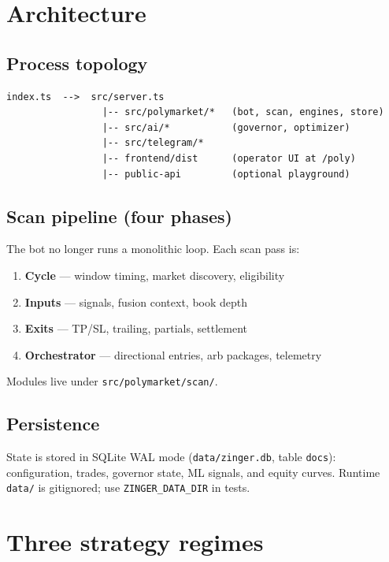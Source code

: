 \documentclass[11pt,a4paper]{report}
\begin{document}
\chapter{Architecture}

\section{Process topology}

\begin{verbatim}
index.ts  -->  src/server.ts
                 |-- src/polymarket/*   (bot, scan, engines, store)
                 |-- src/ai/*           (governor, optimizer)
                 |-- src/telegram/*
                 |-- frontend/dist      (operator UI at /poly)
                 |-- public-api         (optional playground)
\end{verbatim}

\section{Scan pipeline (four phases)}

The bot no longer runs a monolithic loop. Each scan pass is:

\begin{enumerate}
  \item \textbf{Cycle} --- window timing, market discovery, eligibility
  \item \textbf{Inputs} --- signals, fusion context, book depth
  \item \textbf{Exits} --- TP/SL, trailing, partials, settlement
  \item \textbf{Orchestrator} --- directional entries, arb packages, telemetry
\end{enumerate}

Modules live under \texttt{src/polymarket/scan/}.

\section{Persistence}

State is stored in SQLite WAL mode (\texttt{data/zinger.db}, table \texttt{docs}):
configuration, trades, governor state, ML signals, and equity curves.
Runtime \texttt{data/} is gitignored; use \texttt{ZINGER\_DATA\_DIR} in tests.

\chapter{Three strategy regimes}
\end{document}
